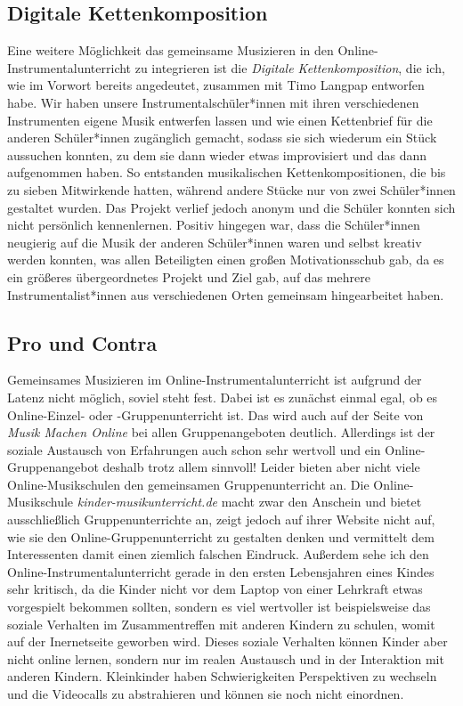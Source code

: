 \subsection{Digitale Kettenkomposition}

Eine weitere Möglichkeit das gemeinsame Musizieren in den
Online-Instrumentalunterricht zu integrieren ist die \emph{Digitale
Kettenkomposition}, die ich, wie im Vorwort bereits angedeutet, zusammen mit
Timo Langpap entworfen habe. Wir haben unsere Instrumentalschüler*innen mit
ihren verschiedenen Instrumenten eigene Musik entwerfen lassen und wie einen
Kettenbrief für die anderen Schüler*innen zugänglich gemacht, sodass sie sich
wiederum ein Stück aussuchen konnten, zu dem sie dann wieder etwas improvisiert
und das dann aufgenommen haben. So entstanden musikalischen Kettenkompositionen,
die bis zu sieben Mitwirkende hatten, während andere Stücke nur von zwei
Schüler*innen gestaltet wurden. Das Projekt verlief jedoch anonym und die
Schüler konnten sich nicht persönlich kennenlernen. Positiv hingegen war, dass
die Schüler*innen neugierig auf die Musik der anderen Schüler*innen waren und
selbst kreativ werden konnten, was allen Beteiligten einen großen
Motivationsschub gab, da es ein größeres übergeordnetes Projekt
und Ziel gab, auf das mehrere Instrumentalist*innen aus verschiedenen Orten
gemeinsam hingearbeitet haben. 


\subsection{Pro und Contra}

Gemeinsames Musizieren im Online-Instrumentalunterricht ist aufgrund der Latenz
nicht möglich, soviel steht fest. Dabei ist es zunächst einmal egal, ob es
Online-Einzel- oder -Gruppenunterricht ist. Das wird auch auf der Seite von
\emph{Musik Machen Online} bei allen Gruppenangeboten deutlich. Allerdings ist
der soziale Austausch von Erfahrungen auch schon sehr wertvoll und ein
Online-Gruppenangebot deshalb trotz allem sinnvoll! Leider bieten aber nicht
viele Online-Musikschulen den gemeinsamen Gruppenunterricht an. Die
Online-Musikschule \emph{kinder-musikunterricht.de} macht zwar den Anschein und
bietet ausschließlich Gruppenunterrichte an, zeigt jedoch auf ihrer Website
nicht auf, wie sie den Online-Gruppenunterricht zu gestalten denken und
vermittelt dem Interessenten damit einen ziemlich falschen Eindruck. Außerdem
sehe ich den Online-Instrumentalunterricht gerade in den ersten Lebensjahren
eines Kindes sehr kritisch, da die Kinder nicht vor dem Laptop von einer
Lehrkraft etwas vorgespielt bekommen sollten, sondern es viel wertvoller ist
beispielsweise das soziale Verhalten im Zusammentreffen mit anderen Kindern zu
schulen, womit auf der Inernetseite geworben wird. Dieses soziale Verhalten
können Kinder aber nicht online lernen, sondern nur im realen Austausch und in
der Interaktion mit anderen Kindern. Kleinkinder haben Schwierigkeiten
Perspektiven zu wechseln und die Videocalls zu abstrahieren und können sie noch
nicht einordnen.


